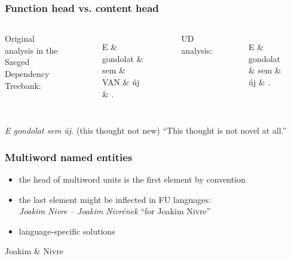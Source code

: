 \documentclass{beamer}
\begin{document}
\begin{frame}
\frametitle{Function head vs. content head}

\begin{columns}
Original analysis in the Szeged Dependency Treebank:

\begin{figure}%
	\centering
\begin{dependency}[theme = simple]
   \begin{deptext}[column sep=0.9em]
      E \& gondolat \& sem \& VAN \& \'{u}j \& . \\
   \end{deptext}
\end{dependency}
		\label{kopuladep}
\end{figure}

UD analysis:

\begin{figure}%
	\centering
\begin{dependency}[theme = simple]
   \begin{deptext}[column sep=0.9em]
      E \& gondolat \& sem \& \'{u}j \& .\\
   \end{deptext}
\end{dependency}
	\label{kopulaud}
\end{figure}
\end{columns}

\textit{E gondolat sem \'uj.} (this thought not new) ``This thought is not novel at all.''\\
\end{frame}

\begin{frame}
\frametitle{Multiword named entities}
\begin{itemize}
\item the head of multiword units is the first element by convention
\item the last element might be inflected in FU languages:\\
\emph{Joakim Nivre} -- \emph{Joakim Nivr\'enek} ``for Joakim Nivre''
\item language-specific solutions
\end{itemize}

\begin{dependency}[theme = simple]
   \begin{deptext}[column sep=1em]
      Joakim \& Nivre \\
   \end{deptext}
\end{dependency}
\end{frame}
\end{document}
